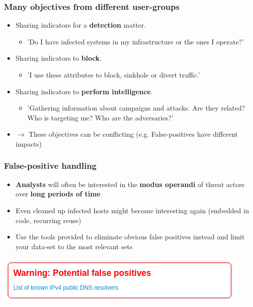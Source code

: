 \begin{frame}
	\frametitle{Many objectives from different user-groups}
    \begin{itemize}
        \item Sharing indicators for a {\bf detection} matter.
        \begin{itemize}
            \item 'Do I have infected systems in my infrastructure or the ones I operate?'
        \end{itemize}
        \item Sharing indicators to {\bf block}.
        \begin{itemize}
            \item 'I use these attributes to block, sinkhole or divert traffic.'
		\end{itemize}
		\item Sharing indicators to {\bf perform intelligence}.
		\begin{itemize}
			\item 'Gathering information about campaigns and attacks. Are they related? Who is targeting me? Who are the adversaries?'
		\end{itemize}
		\item $\rightarrow$ These objectives can be conflicting (e.g. False-positives have different impacts)
	\end{itemize}
\end{frame}

\begin{frame}
\frametitle{False-positive handling}
\begin{itemize}
    \item {\bf Analysts} will often be interested in the {\bf modus operandi} of threat actors over {\bf long periods of time}
	\item Even cleaned up infected hosts might become interesting again (embedded in code, recurring reuse)
	\item Use the tools provided to eliminate obvious false positives instead and limit your data-set to the most relevant sets
\end{itemize}
\centering\includegraphics[scale=0.8]{../images/false-positive.png}
\end{frame}

